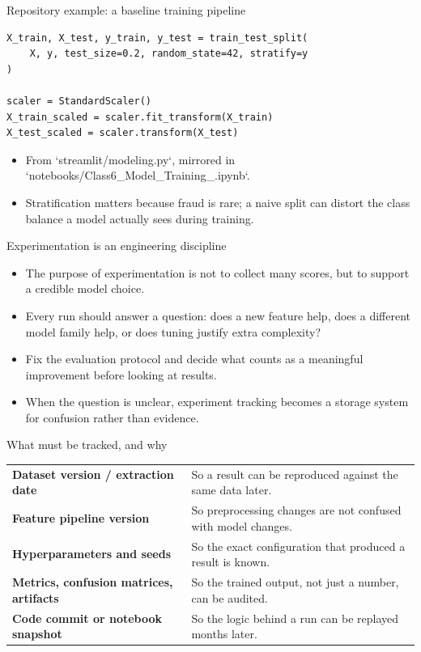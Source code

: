 \begin{frame}[fragile]{Repository example: a baseline training pipeline}
\begin{lstlisting}[style=coursepython]
X_train, X_test, y_train, y_test = train_test_split(
    X, y, test_size=0.2, random_state=42, stratify=y
)

scaler = StandardScaler()
X_train_scaled = scaler.fit_transform(X_train)
X_test_scaled = scaler.transform(X_test)
\end{lstlisting}
\begin{itemize}
\item From `streamlit/modeling.py`, mirrored in `notebooks/Class6_Model_Training_.ipynb`.
\item Stratification matters because fraud is rare; a naive split can distort the class balance a model actually sees during training.
\end{itemize}
\coursefooter
\end{frame}

\begin{frame}{Experimentation is an engineering discipline}
\begin{itemize}
\item The purpose of experimentation is not to collect many scores, but to support a credible model choice.
\item Every run should answer a question: does a new feature help, does a different model family help, or does tuning justify extra complexity?
\item Fix the evaluation protocol and decide what counts as a meaningful improvement before looking at results.
\item When the question is unclear, experiment tracking becomes a storage system for confusion rather than evidence.
\end{itemize}
\coursefooter
\end{frame}

\begin{frame}{What must be tracked, and why}
\begin{tabularx}{\textwidth}{>{\bfseries}l X}
Dataset version / extraction date & So a result can be reproduced against the same data later. \\
Feature pipeline version & So preprocessing changes are not confused with model changes. \\
Hyperparameters and seeds & So the exact configuration that produced a result is known. \\
Metrics, confusion matrices, artifacts & So the trained output, not just a number, can be audited. \\
Code commit or notebook snapshot & So the logic behind a run can be replayed months later. \\
\end{tabularx}
\coursefooter
\end{frame}

